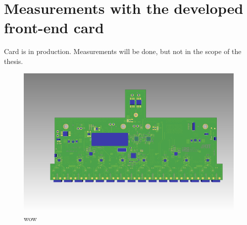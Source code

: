 \section{Measurements with the developed front-end card}
Card is in production. Measurements will be done, but not in the scope of the thesis.
\begin{figure}[H]
	\centering
	\includegraphics[width = \textwidth]{chap/05-conclusion/img/board_ugly}
	\caption{wow}
	\label{fig:board}
\end{figure}

